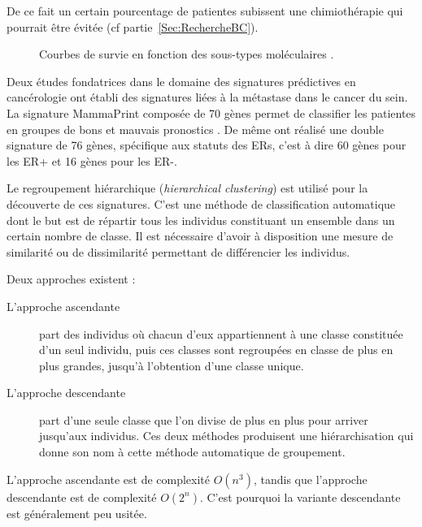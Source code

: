 			De ce fait un certain pourcentage de patientes subissent une chimiothérapie qui pourrait être évitée \citep{Bertucci2002} (cf partie~\ref{Sec:RechercheBC}).

			\begin{figure}
				\centering
				\def\svgwidth{\columnwidth}
				
				\caption{Courbes de survie en fonction des sous-types moléculaires \citep{Perou2000,Sorlie2001,Hu2006}.}
				\label{fig:Subtypes-survival}
			\end{figure}

			Deux études fondatrices dans le domaine des signatures prédictives en cancérologie ont établi des signatures liées à la métastase dans le cancer du sein.
			La signature MammaPrint composée de 70 gènes permet de classifier les patientes en groupes de bons et mauvais pronostics \citep{vandevijver2002}.
			De même \citeauthor{Wang2005} ont réalisé une double signature de 76 gènes, spécifique aux statuts des \acp{ER}, c'est à dire 60 gènes pour les \acs{ER+} et 16 gènes pour les \acs{ER-}.

			Le regroupement hiérarchique (\emph{hierarchical clustering}) est utilisé pour la découverte de ces signatures.
			C'est une méthode de classification automatique dont le but est de répartir tous les individus constituant un ensemble dans un certain nombre de classe.
			Il est nécessaire d'avoir à disposition une mesure de similarité ou de dissimilarité permettant de différencier les individus.


			Deux approches existent :
			\begin{description}

			\item [L'approche ascendante]part des individus où chacun d'eux appartiennent à une classe constituée d'un seul individu, puis ces classes sont regroupées en classe de plus en plus grandes, jusqu'à l'obtention d'une classe unique.

			\item [L'approche descendante]part d'une seule classe que l'on divise de plus en plus pour arriver jusqu'aux individus.
			Ces deux méthodes produisent une hiérarchisation qui donne son nom à cette méthode automatique de groupement.
			\end{description}

			L'approche ascendante est de complexité $O(n^{3})$, tandis que l'approche descendante est de complexité $O(2^{n})$.
			C'est pourquoi la variante descendante est généralement peu usitée.

